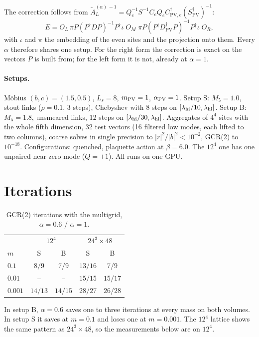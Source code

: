 \documentclass[11pt,a4paper]{article}
\newcommand{\Dpv}{D_{\mathrm{PV}}}
\newcommand{\AL}{\tilde A_{L}}
\newcommand{\Ce}{C_{e}}
\newcommand{\Cpve}{C_{\mathrm{PV},e}}
\newcommand{\Spv}{S_{\mathrm{PV}}}
\newcommand{\dg}{^{\dagger}}
\begin{document}
\noindent The correction follows from
$\AL^{(\alpha)\,-1}=Q_e^{-1}S^{-1}\Ce Q_e\Cpve\dg(\Spv\dg)^{-1}$:
\begin{equation}
E=O_L\,\pi P(P\dg DP)^{-1}P\dg\iota\;O_M\;\pi P(P\dg\Dpv\dg P)^{-1}P\dg\iota\;O_R ,
\end{equation}
with $\iota$ and $\pi$ the embedding of the even sites and the projection onto them. Every $\alpha$ therefore shares one
setup. For the right form the correction is exact on the vectors $P$ is built from; for the
left form it is not, already at $\alpha=1$.

\paragraph{Setups.} M\"obius $(b,c)=(1.5,0.5)$, $L_s=8$, $m_{\rm PV}=1$, $\alpha_{\rm PV}=1$.
Setup S: $M_5=1.0$, stout links ($\rho=0.1$, 3 steps), Chebyshev with 8 steps on
$[\lambda_{\rm hi}/10,\lambda_{\rm hi}]$. Setup B: $M_5=1.8$, unsmeared links, 12 steps on
$[\lambda_{\rm hi}/30,\lambda_{\rm hi}]$. Aggregates of $4^4$ sites with the whole fifth
dimension, 32 test vectors (16 filtered low modes, each lifted to two columns), coarse solves
in single precision to $|r|^2/|b|^2<10^{-2}$, GCR(2) to $10^{-18}$. Configurations: quenched,
plaquette action at $\beta=6.0$. The $12^4$ one has one unpaired near-zero mode ($Q=+1$).
All runs on one GPU.

\section{Iterations}
\begin{table}[h]
\centering
\caption{GCR(2) iterations with the multigrid, $\alpha=0.6$ / $\alpha=1$.}
\label{tab:iter}
\begin{tabular}{@{}lcccc@{}}
\toprule
 & \multicolumn{2}{c}{$12^4$} & \multicolumn{2}{c}{$24^3\times48$}\\
$m$ & S & B & S & B\\
\midrule
$0.1$   & $8/9$   & $7/9$   & $13/16$ & $7/9$\\
$0.01$  & --      & --      & $15/15$ & $15/17$\\
$0.001$ & $14/13$ & $14/15$ & $28/27$ & $26/28$\\
\bottomrule
\end{tabular}
\end{table}
In setup B, $\alpha=0.6$ saves one to three iterations at every mass on both volumes. In
setup S it saves at $m=0.1$ and loses one at $m=0.001$. The $12^4$ lattice shows the same
pattern as $24^3\times48$, so the measurements below are on $12^4$.
\end{document}
